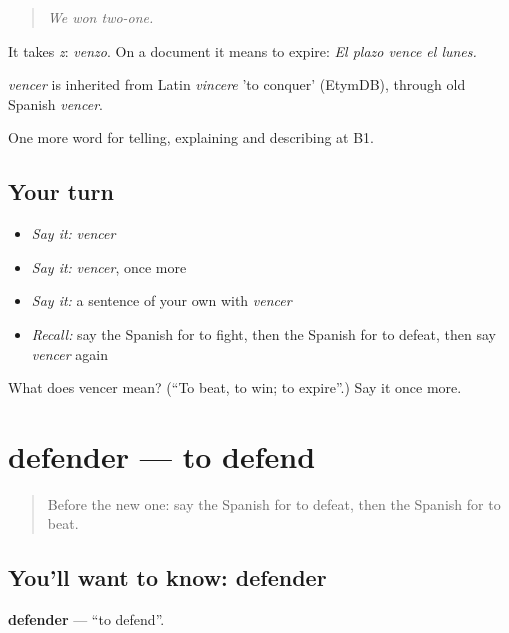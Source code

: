 \begin{quote}
\emph{We won two-one.}
\end{quote}

It takes \emph{z}: \emph{venzo}. On a document it means to expire: \emph{El plazo vence el lunes.}

\begin{cousinweb}
\emph{vencer} is inherited from Latin \emph{vincere} 'to conquer' (EtymDB), through old Spanish \emph{vencer}.
\end{cousinweb}

\begin{grammarlens}[title={What you've built}]
One more word for telling, explaining and describing at B1.
\end{grammarlens}

\subsection*{Your turn}
\begin{itemize}
\raggedright
  \item \emph{Say it:} \emph{vencer}
  \item \emph{Say it:} \emph{vencer}, once more
  \item \emph{Say it:} a sentence of your own with \emph{vencer}
  \item \emph{Recall:} say the Spanish for to fight, then the Spanish for to defeat, then say \emph{vencer} again
\end{itemize}

\begin{tcolorbox}[breakable,colback=teal!4,colframe=teal!35!black,title={Before you move on}]
What does vencer mean? (\textquotedblleft{}To beat, to win; to expire\textquotedblright{}.) Say it once more.
\end{tcolorbox}
\section[defender]{defender — to defend}

\label{lesson:ES-C569-defender}



\begin{quote}
Before the new one: say the Spanish for to defeat, then the Spanish for to beat.
\end{quote}

\subsection*{You'll want to know: defender}
\textbf{defender} — \textquotedblleft{}to defend\textquotedblright{}.

